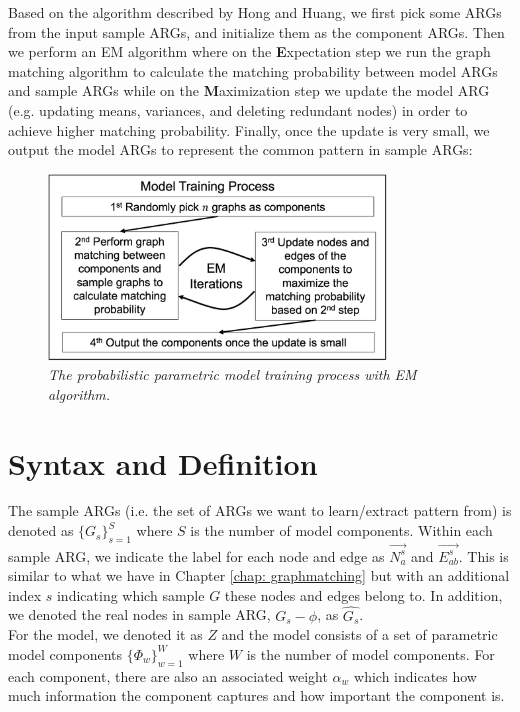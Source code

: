 Based on the algorithm described by Hong and Huang, we first pick some ARGs from the input sample ARGs, and initialize them as the component ARGs. Then we perform an EM algorithm where on the \textbf{E}xpectation step we run the graph matching algorithm to calculate the matching probability between model ARGs and sample ARGs while on the \textbf{M}aximization step we update the model ARG (e.g. updating means, variances, and deleting redundant nodes) in order to achieve higher matching probability. Finally, once the update is very small, we output the model ARGs to represent the common pattern in sample ARGs:\\

\begin{figure}[h]
	\centering
	\captionsetup{justification=centering}
	\includegraphics[width=0.8\textwidth]{figs/model_training.png}
	\caption[Caption for LOF]{\emph{The probabilistic parametric model training process with EM algorithm.}}
	\label{fig:model_training}
\end{figure}

\section{Syntax and Definition}

The sample ARGs (i.e. the set of ARGs we want to learn/extract pattern from) is denoted as $\{G_s\}_{s=1}^S$ where $S$ is the number of model components. Within each sample ARG, we indicate the label for each node and edge as $\overrightarrow{N^s_a}$ and $\overrightarrow{E^s_{ab}}$. This is similar to what we have in Chapter \ref{chap: graphmatching} but with an additional index $s$ indicating which sample $G$ these nodes and edges belong to. In addition, we denoted the real nodes in sample ARG, $G_s-\phi$, as $\widehat{G_s}$.\\

For the model, we denoted it as $Z$ and the model consists of a set of parametric model components $\{\Phi_w\}_{w=1}^W$ where $W$ is the number of model components. For each component, there are also an associated weight $\alpha_w$ which indicates how much information the component captures and how important the component is.\\

